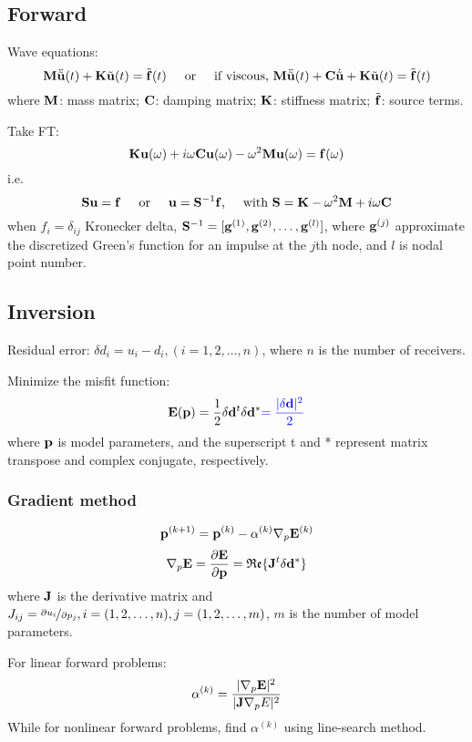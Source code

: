 \subsection{Forward}
Wave equations:
\[ \mathbf{M}\ddot{\tilde{\mathbf{u}}}(t)+\mathbf{K}\tilde{\mathbf{u}}(t)=\tilde{\mathbf{f}}(t) \text{\hspace{5mm}or\hspace{5mm}if viscous,~} \mathbf{M}\ddot{\tilde{\mathbf{u}}}(t)+\mathbf{C}\dot{\tilde{\mathbf{u}}}+\mathbf{K}\tilde{\mathbf{u}}(t)=\tilde{\mathbf{f}}(t) \]
where $\mathbf{M}$: mass matrix; $\mathbf{C}$: damping matrix; $\mathbf{K}$:
stiffness matrix; $\tilde{\mathbf{f}}$: source terms.

Take FT:
\[ \mathbf{K}\mathbf{u}(\omega)+i\omega\mathbf{C}\mathbf{u}(\omega)-\omega^2\mathbf{M}\mathbf{u}(\omega)=\mathbf{f}(\omega) \]
i.e.
\[ \mathbf{S}\mathbf{u}=\mathbf{f} \text{\hspace{5mm}or\hspace{5mm}} \mathbf{u}=\mathbf{S}^{-1}\mathbf{f} \text{,\hspace{5mm}with~} \mathbf{S}=\mathbf{K}-\omega^2\mathbf{M}+i\omega\mathbf{C} \]
when $f_i=\delta_{ij}$ Kronecker delta,
$\mathbf{S}^{-1}=[\mathbf{g}^{(1)},\mathbf{g}^{(2)},\ldots,\mathbf{g}^{(l)}]$,
where $\mathbf{g}^{(j)}$ approximate the discretized Green's function for an impulse at the $j$th node,
and $l$ is nodal point number.

\subsection{Inversion}
Residual error: $\delta d_i=u_i-d_i,(i=1,2,\ldots,n)$, where $n$ is the number of receivers.

Minimize the misfit function:
\[ \mathbf{E}(\mathbf{p})=\frac{1}{2}\delta\mathbf{d}^t\delta\mathbf{d}^*{\color{blue}=\frac{|\delta\mathbf{d}|^2}{2}} \]
where $\mathbf{p}$ is model parameters, and the superscript t and *
represent matrix transpose and complex conjugate, respectively.

\subsubsection{Gradient method}
\[ \mathbf{p}^{(k+1)}=\mathbf{p}^{(k)}-\alpha^{(k)}\nabla_p\mathbf{E}^{(k)} \]
\[ \nabla_p\mathbf{E}=\frac{\partial\mathbf{E}}{\partial\mathbf{p}}=\mathfrak{Re}\{\mathbf{J}^t\delta\mathbf{d}^*\} \]
where $\mathbf{J}$ is the \Frechet derivative matrix
and $J_{ij}=\nicefrac{\partial u_i}{\partial p_j},i=(1,2,\ldots,n),j=(1,2,\ldots,m)$,
$m$ is the number of model parameters.

For linear forward problems:
\[ \alpha^{(k)}=\frac{|\nabla_p\mathbf{E}|^2}{|\mathbf{J}\nabla_p E|^2} \]
While for nonlinear forward problems, find $\alpha^{(k)}$ using line-search method.

